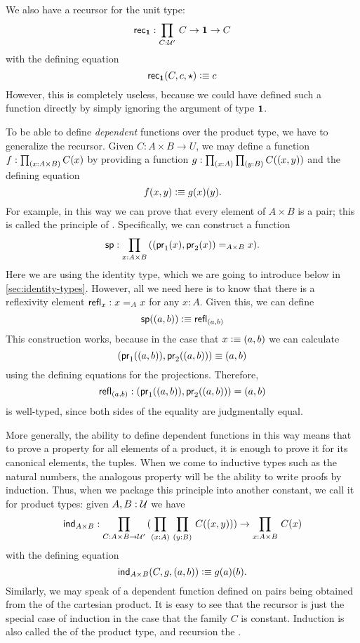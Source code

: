 We also have a recursor for the unit type:
\[\rec{\unit} : \prd{C:\UU'}C \to \unit \to C\]
with the defining equation
\[ \mathsf{rec}_{\mathbf{1}}(C,c,\star) \vcentcolon\equiv c \]
However, this is completely useless,
because we could have defined such a function directly
by simply ignoring the argument of type $\mathbf{1}$.

To be able to define \emph{dependent} functions over the product type, we have
to generalize the recursor. Given $C: A \times B \to U$, we may
define a function $f : \prd{x : A \times B} C(x)$ by providing a
function $g : \prd{x:A}\prd{y:B} C(\tup{x}{y})$ and the defining equation
\[ f(x,y) \vcentcolon\equiv g(x)(y). \] 
For example, in this way we can prove that every element of $A\times B$ is a pair; this is called the principle of .
Specifically, we can construct a function
\[ \spr : \prd{x:A \times B} (\tup{\fst {(x)}}{\snd {(x)}} =_{A\times B} x). \]
Here we are using the identity type, which we are going to introduce below in \autoref{sec:identity-types}.
However, all we need here is to know that there is a reflexivity element $\mathsf{refl}_{x} : x =_A x$ for any $x:A$.
Given this, we can define
\[ \mathsf{sp}((a,b)) \vcentcolon\equiv \mathsf{refl}_{(a,b)} \]
This construction works, because in the case that $x \vcentcolon\equiv (a,b)$ we can 
calculate 
\[ (\mathsf{pr}_{1}((a,b)),\mathsf{pr}_{2}{((a,b))}) \equiv (a,b) \]
using the defining equations for the projections. Therefore,
\[ \mathsf{refl}_{(a,b)} : (\mathsf{pr}_{1}((a,b)),\mathsf{pr}_{2}{((a,b))}) = (a,b) \]
is well-typed, since both sides of the equality are judgmentally equal.

More generally, the ability to define dependent functions in this way means that to prove a property for all elements of a product, it is enough 
to prove it for its canonical elements, the tuples.
When we come to inductive types such as the natural numbers, the analogous property will be the ability to write proofs by induction.
Thus, when we package this principle into another constant, we call it
 for product types: given $A,B : \mathcal{U}$ we have
\[ \ind{A\times B} : \prd{C:A \times B \to \UU'} (\prd{x:A}{y:B}
C(\tup{x}{y})) \to \prd{x:A \times B} C(x) \]
with the defining equation 
\[ \mathsf{ind}_{A\times B}(C,g,(a,b)) \vcentcolon\equiv g(a)(b). \]
Similarly, we may speak of a dependent function defined on pairs being obtained from the  of the cartesian product.
It is easy to see that the recursor is just the special case of induction
in the case that the family $C$ is constant.
Induction is also called the  of the product type, and recursion the .

